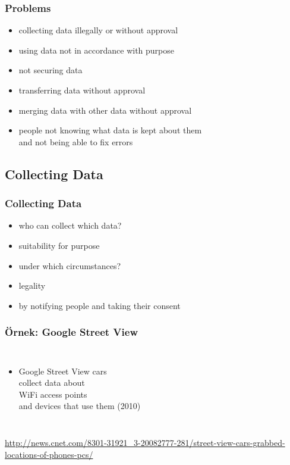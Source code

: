 \documentclass[dvipsnames]{beamer}
\theoremstyle{plain}
\begin{document}
\begin{frame}
  \frametitle{Problems}

  \begin{itemize}
    \item collecting data illegally or without approval
    \item using data not in accordance with purpose
    \item not securing data
    \item transferring data without approval
    \item merging data with other data without approval
    \item people not knowing what data is kept about them\\
      and not being able to fix errors
  \end{itemize}
\end{frame}

\subsection{Collecting Data}

\begin{frame}
  \frametitle{Collecting Data}

  \begin{itemize}
    \item who can collect which data?
    \item suitability for purpose

    \pause
    \bigskip
    \item under which circumstances?
    \item legality
    \item by notifying people and taking their consent
  \end{itemize}
\end{frame}

\begin{frame}
  \frametitle{Örnek: Google Street View}

  \begin{columns}

    \begin{itemize}
      \item Google Street View cars\\
        collect data about\\
        WiFi access points\\
        and devices that use them (2010)
    \end{itemize}
  \end{columns}

  \medskip
  \tiny{\url{http://news.cnet.com/8301-31921_3-20082777-281/street-view-cars-grabbed-locations-of-phones-pcs/}}\\
\end{frame}
\end{document}
